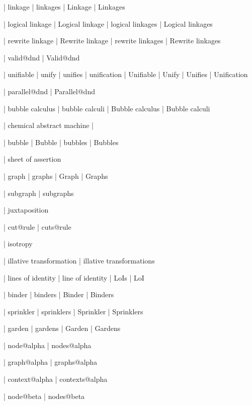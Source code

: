 
 | linkage
 | linkages
 | Linkage
 | Linkages

 | logical linkage
 | Logical linkage
 | logical linkages
 | Logical linkages

 | rewrite linkage
 | Rewrite linkage
 | rewrite linkages
 | Rewrite linkages

 | valid@dnd
 | Valid@dnd

 | unifiable
 | unify
 | unifies
 | unification
 | Unifiable
 | Unify
 | Unifies
 | Unification

 | parallel@dnd
 | Parallel@dnd


 | bubble calculus
 | bubble calculi
 | Bubble calculus
 | Bubble calculi

 | chemical abstract machine
 | \cham

 | bubble
 | Bubble
 | bubbles
 | Bubbles


 | sheet of assertion
 
 | graph
 | graphs
 | Graph
 | Graphs

 | subgraph
 | subgraphs

 | juxtaposition

 | cut@rule
 | cuts@rule

 | isotropy

 | illative transformation
 | illative transformations

 | lines of identity
 | line of identity
 | LoIs
 | LoI

 | binder
 | binders
 | Binder
 | Binders

 | sprinkler
 | sprinklers
 | Sprinkler
 | Sprinklers

 | garden
 | gardens
 | Garden
 | Gardens

 | node@alpha
 | nodes@alpha

 | graph@alpha
 | graphs@alpha

 | context@alpha
 | contexts@alpha

 | node@beta
 | nodes@beta

